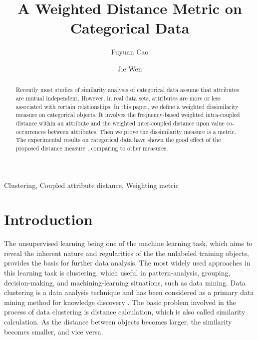 \documentclass[review]{elsarticle}
\begin{document}
\begin{frontmatter}
\title{A Weighted Distance Metric on Categorical Data}

\author[a]{Fuyuan Cao}

\author[a]{Jie Wen}


\address[a]{Key Laboratory of Computational
Intelligence and Chinese Information Processing of Ministry of
Education, School of Computer and Information Technology, Shanxi
University, Taiyuan 030006, China}

\begin{abstract}
Recently most studies of similarity analysis of categorical data assume that attributes are mutual independent. However, in real data sets, attributes are more or less associated with certain relationships. In this paper, we define a weighted dissimilarity measure on categorical objects. It involves the frequency-based weighted intra-coupled distance within an attribute and the weighted inter-coupled distance upon value co-occurrences between attributes. Then we prove the dissimilarity measure is a metric. The experimental results on categorical data have shown the good effect of the proposed distance measure , comparing to other measures.
\end{abstract}
\begin{keyword}
Clustering, Coupled attribute distance, Weighting metric
\end{keyword}

\end{frontmatter}

\section{Introduction}
The unsupervised learning being one of the machine learning task, which aims to reveal the inherent nature and regularities of the the unlabeled training objects, provides the basis for further data analysis. The most widely used approaches in this learning task is clustering, which useful in pattern-analysis, grouping, decision-making, and machining-learning situations, such as data mining. Data clustering is a data analysis technique and has been considered as a primary data mining method for knowledge discovery \cite{Labiod2011A}. The basic problem involved in the process of data clustering is distance calculation, which is also called similarity calculation. As the distance between objects becomes larger, the similarity becomes smaller, and vice versa.
\end{document}
